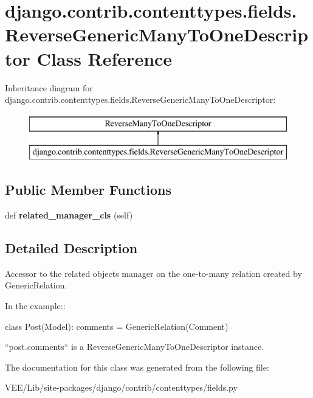 \hypertarget{classdjango_1_1contrib_1_1contenttypes_1_1fields_1_1_reverse_generic_many_to_one_descriptor}{}\section{django.\+contrib.\+contenttypes.\+fields.\+Reverse\+Generic\+Many\+To\+One\+Descriptor Class Reference}
\label{classdjango_1_1contrib_1_1contenttypes_1_1fields_1_1_reverse_generic_many_to_one_descriptor}
Inheritance diagram for django.\+contrib.\+contenttypes.\+fields.\+Reverse\+Generic\+Many\+To\+One\+Descriptor\+:\begin{figure}[H]
\begin{center}
\leavevmode
\includegraphics[height=2.000000cm]{classdjango_1_1contrib_1_1contenttypes_1_1fields_1_1_reverse_generic_many_to_one_descriptor}
\end{center}
\end{figure}
\subsection*{Public Member Functions}
\begin{DoxyCompactItemize}
\item 
\mbox{\label{classdjango_1_1contrib_1_1contenttypes_1_1fields_1_1_reverse_generic_many_to_one_descriptor_a64b60a8f99e1432381f94b8e26233ccb}} 
def {\bfseries related\+\_\+manager\+\_\+cls} (self)
\end{DoxyCompactItemize}


\subsection{Detailed Description}
\begin{DoxyVerb}Accessor to the related objects manager on the one-to-many relation created
by GenericRelation.

In the example::

    class Post(Model):
        comments = GenericRelation(Comment)

``post.comments`` is a ReverseGenericManyToOneDescriptor instance.
\end{DoxyVerb}
 

The documentation for this class was generated from the following file\+:\begin{DoxyCompactItemize}
\item 
V\+E\+E/\+Lib/site-\/packages/django/contrib/contenttypes/fields.\+py\end{DoxyCompactItemize}

